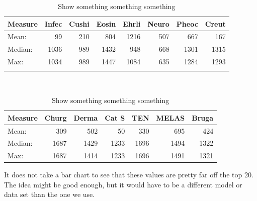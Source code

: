 \begin{table}[H]
  \begin{tiny}
    \begin{center}
    \begin{tabular}{|l|r|r|r|r|r|r|r|}
      \hline
      Measure &Infec&Cushi&Eosin&Ehrli&Neuro&Pheoc&Creut \\
      \hline
      Mean:   &   99 & 210 &  804 & 1216 & 507 &  667 & 167 \\
      \hline
      Median: & 1036 & 989 & 1432 &  948 & 668 & 1301 & 1315 \\
      \hline
      Max:    & 1034 & 989 & 1447 & 1084 & 635 & 1284 & 1293 \\
      \hline
      \multicolumn{8}{c}{} \\
    \end{tabular} \\
    \begin{tabular}{|l|r|r|r|r|r|r|}
      \hline
      Measure &Churg&Derma&Cat S&TEN&MELAS&Bruga \\
      \hline
      Mean:   &  309 & 502  &   50 &  330 &  695 &  424 \\
      \hline
      Median: & 1687 & 1429 & 1233 & 1696 & 1494 & 1322 \\
      \hline
      Max:    & 1687 & 1414 & 1233 & 1696 & 1491 & 1321 \\
      \hline
    \end{tabular}
    \end{center}
  \end{tiny}
  \caption{Show something something something}
  \label{ThisIsATable}
\end{table}

It does not take a bar chart to see that these values are pretty far off
the top 20. The idea might be good enough, but it would have to be a
different model or data set than the one we use.
